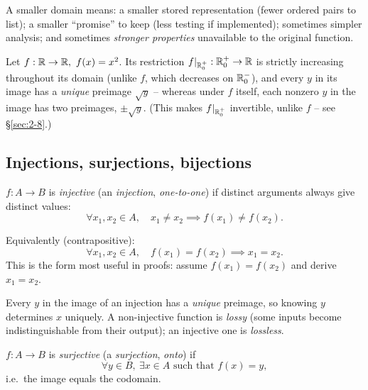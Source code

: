 \documentclass[11pt]{article}
\begin{document}
\begin{note}
A smaller domain means: a smaller stored representation (fewer ordered pairs to list); a smaller ``promise'' to keep (less testing if implemented); sometimes simpler analysis; and sometimes \emph{stronger properties} unavailable to the original function.
\end{note}

\begin{example}
Let $f: \mathbb{R} \to \mathbb{R},\ f(x)=x^2$. Its restriction $f|_{\mathbb{R}_0^+} : \mathbb{R}_0^+ \to \mathbb{R}$ is strictly increasing throughout its domain (unlike $f$, which decreases on $\mathbb{R}_0^-$), and every $y$ in its image has a \emph{unique} preimage $\sqrt{y}$ -- whereas under $f$ itself, each nonzero $y$ in the image has two preimages, $\pm\sqrt{y}$. (This makes $f|_{\mathbb{R}_0^+}$ invertible, unlike $f$ -- see \S\ref{sec:2-8}.)
\end{example}

\subsection{Injections, surjections, bijections}
\label{sec:2-7}

\begin{definition}
$f: A \to B$ is \emph{injective} (an \emph{injection}, \emph{one-to-one}) if distinct arguments always give distinct values:
\[
\forall x_1, x_2 \in A,\quad x_1 \neq x_2 \implies f(x_1) \neq f(x_2).
\]
\end{definition}

\begin{note}
Equivalently (contrapositive):
\[
\forall x_1, x_2 \in A,\quad f(x_1) = f(x_2) \implies x_1 = x_2.
\]
This is the form most useful in proofs: assume $f(x_1)=f(x_2)$ and derive $x_1=x_2$.
\end{note}

\begin{note}
Every $y$ in the image of an injection has a \emph{unique} preimage, so knowing $y$ determines $x$ uniquely. A non-injective function is \emph{lossy} (some inputs become indistinguishable from their output); an injective one is \emph{lossless}.
\end{note}

\begin{definition}
$f: A \to B$ is \emph{surjective} (a \emph{surjection}, \emph{onto}) if
\[
\forall y \in B,\ \exists x \in A \text{ such that } f(x) = y,
\]
i.e.\ the image equals the codomain.
\end{definition}
\end{document}
